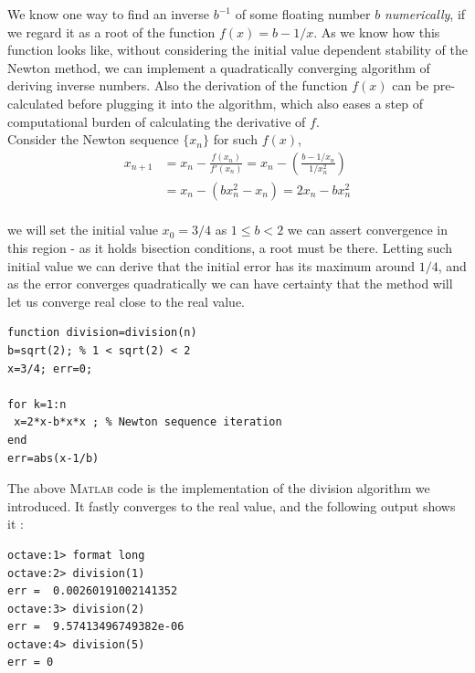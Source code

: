 \documentclass[paper=a4, fontsize=11pt]{scrartcl}
\newcommand{\MATLAB}{\textsc{Matlab}\xspace}
\begin{document}
We know one way to find an inverse $b^{-1}$ of some floating number $b$ \textit{numerically}, if we regard it as a root of the function $f(x)=b-1/x$. As we know how this function looks like, without considering the initial value dependent stability of the Newton method, we can implement a quadratically converging algorithm of deriving inverse numbers. Also the derivation of the function $f(x)$ can be pre-calculated before plugging it into the algorithm, which also eases a step of computational burden of calculating the derivative of $f$.\\

Consider the Newton sequence $\{x_n\}$ for such $f(x)$, \\

\begin{equation}\nonumber
\begin{split}
		x_{n+1} &= x_n - \frac{f(x_n)}{f'(x_n)} = x_n - \left( \frac{b- 1/x_n}{1/x_n^2}\right) \\[1.5ex]
		&= x_n - (bx_n^2 -x_n) = 2x_n - bx_n^2
\end{split}
\end{equation}\\

we will set the initial value $x_0=3/4$ as $1\leq b <2$ we can assert convergence in this region - as it holds bisection conditions, a root must be there. Letting such initial value we can derive that the initial error has its maximum around $1/4$, and as the error converges quadratically we can have certainty that the method will let us converge real close to the real value.

\vspace{0.15in}
\begin{lstlisting}[caption=division.m]
function division=division(n) 
b=sqrt(2); % 1 < sqrt(2) < 2
x=3/4; err=0;

for k=1:n
 x=2*x-b*x*x ; % Newton sequence iteration
end
err=abs(x-1/b)
\end{lstlisting}
\vspace{0.15in}

The above \MATLAB code is the implementation of the division algorithm we introduced. It fastly converges to the real value, and the following output shows it :

\begin{verbatim}
octave:1> format long
octave:2> division(1)
err =  0.00260191002141352
octave:3> division(2)
err =  9.57413496749382e-06
octave:4> division(5)
err = 0
\end{verbatim}
\end{document}
